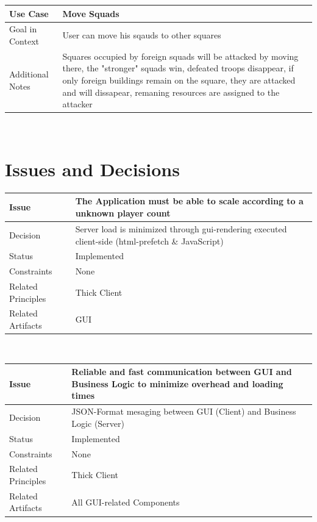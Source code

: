 \documentclass[a4paper]{article}
\begin{document}
\begin{tabular}[t]{|l|l|l|}
\hline
\textbf{Use Case}	&	\multicolumn{2}{|l|}{\textbf{Move Squads}}\\
\hline
Goal in Context	&	\multicolumn{2}{|l|}{User can move his sqauds to other squares}\\
\hline
Additional Notes	&	\multicolumn{2}{|p{10cm}|}{Squares occupied by foreign squads will be attacked by moving there, the "stronger" squads win, defeated troops disappear, if only foreign buildings remain on the square, they are attacked and will dissapear, remaning resources are assigned to the attacker}\\
\hline
\end{tabular}\\

\clearpage

\section{Issues and Decisions}

\begin{tabular}[t]{|l|p{10cm}|}
\hline
\textbf{Issue}	&	The Application must be able to scale according to a unknown player count\\
\hline
Decision & Server load is minimized through gui-rendering executed client-side (html-prefetch \& JavaScript)\\
\hline
Status	& Implemented\\
\hline
Constraints	&	None\\
\hline
Related Principles	&	Thick Client\\
\hline
Related Artifacts	&	GUI\\
\hline
\end{tabular}\\

\begin{tabular}[t]{|l|p{10cm}|}
\hline
\textbf{Issue}	&	Reliable and fast communication between GUI and Business Logic to minimize overhead and loading times\\
\hline
Decision	&	JSON-Format mesaging between GUI (Client) and Business Logic (Server)\\
\hline
Status	& Implemented\\
\hline
Constraints	&	None\\
\hline
Related Principles	&	Thick Client\\
\hline
Related Artifacts	&	All GUI-related Components\\
\hline
\end{tabular}\\
\end{document}

